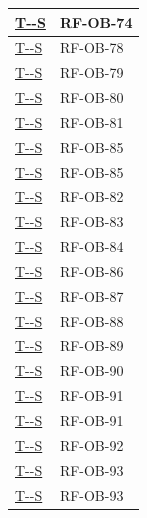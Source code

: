 \documentclass[a4paper,12pt]{article}
\newcounter{testsys}
\newcommand{\systestref}{%
  \hyperlink{T-\arabic{testsys}-S}{T-\arabic{testsys}-S}%
}
\begin{document}
\begin{center}
\begin{longtable}{|>{\centering\arraybackslash}p{5cm}|>{\centering\arraybackslash}p{9cm}|}
\stepcounter{testsys}
\systestref & RF-OB-74 \\
\hline

\stepcounter{testsys}
\systestref & RF-OB-78 \\
\hline

\stepcounter{testsys}
\systestref & RF-OB-79 \\
\hline

\stepcounter{testsys}
\systestref & RF-OB-80 \\
\hline

\stepcounter{testsys}
\systestref & RF-OB-81 \\
\hline

\stepcounter{testsys}
\systestref & RF-OB-85 \\
\hline

\stepcounter{testsys}
\systestref & RF-OB-85 \\
\hline

\stepcounter{testsys}
\systestref & RF-OB-82 \\
\hline

\stepcounter{testsys}
\systestref & RF-OB-83 \\
\hline

\stepcounter{testsys}
\systestref & RF-OB-84 \\
\hline

\stepcounter{testsys}
\systestref & RF-OB-86 \\
\hline

\stepcounter{testsys}
\systestref & RF-OB-87 \\
\hline

\stepcounter{testsys}
\systestref & RF-OB-88 \\
\hline

\stepcounter{testsys}
\systestref & RF-OB-89 \\
\hline

\stepcounter{testsys}
\systestref & RF-OB-90 \\
\hline

\stepcounter{testsys}
\systestref & RF-OB-91 \\
\hline

\stepcounter{testsys}
\systestref & RF-OB-91 \\
\hline

\stepcounter{testsys}
\systestref & RF-OB-92 \\
\hline

\stepcounter{testsys}
\systestref & RF-OB-93 \\
\hline

\stepcounter{testsys}
\systestref & RF-OB-93 \\
\hline


\end{longtable}
\end{center}
\end{document}
